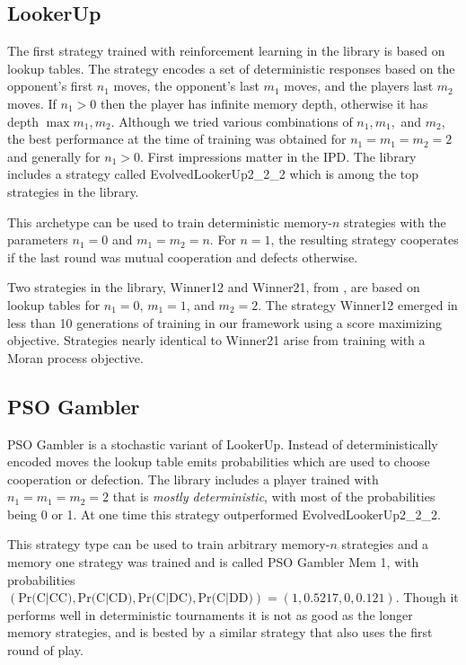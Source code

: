 \documentclass{article}
\begin{document}
\subsection{LookerUp}

The first strategy trained with reinforcement learning in the library is based
on lookup tables. The strategy encodes a set of deterministic responses
based on the opponent's first $n_1$ moves, the opponent's last $m_1$ moves, and
the players last $m_2$ moves. If $n_1 > 0$ then the player has infinite memory
depth, otherwise it has depth $\max{m_1, m_2}$. Although we tried various
combinations of $n_1, m_1,$ and $m_2$, the best performance at the time of
training was obtained for $n_1 = m_1 = m_2 = 2$ and generally for $n_1 > 0$. 
First impressions matter in the IPD. The library includes a strategy
called EvolvedLookerUp2_2_2 which is among the top strategies in the library.

This archetype can be used to train deterministic memory-$n$ strategies with the
parameters $n_1=0$ and $m_1=m_2=n$. For $n=1$, the resulting strategy cooperates
if the last round was mutual cooperation and defects otherwise.

Two strategies in the library, Winner12 and Winner21, from \cite{Mathieu2015},
are based on lookup tables for $n_1 = 0$, $m_1 = 1$, and $m_2=2$. The strategy
Winner12 emerged in less than 10 generations of training in our framework using
a score maximizing objective. Strategies nearly identical to Winner21 arise
from training with a Moran process objective.

\subsection{PSO Gambler}

PSO Gambler is a stochastic variant of LookerUp. Instead of deterministically
encoded moves the lookup table emits probabilities which are
used to choose cooperation or defection. The library includes a player trained
with $n_1 = m_1 = m_2 = 2$ that is \emph{mostly deterministic}, with most of the
probabilities being 0 or 1. At one time this strategy outperformed
EvolvedLookerUp2_2_2.

This strategy type can be used to train arbitrary memory-$n$ strategies and a
memory one strategy was trained and is called PSO Gambler Mem 1, with
probabilities $(\text{Pr(C|CC)}, \text{Pr(C|CD)}, \text{Pr(C|DC)}, \text{Pr(C|DD)}) = (1, 0.5217, 0, 0.121)$. Though it performs well in deterministic tournaments
it is not as good as the longer memory strategies, and is bested by a similar
strategy that also uses the first round of play.
\end{document}
